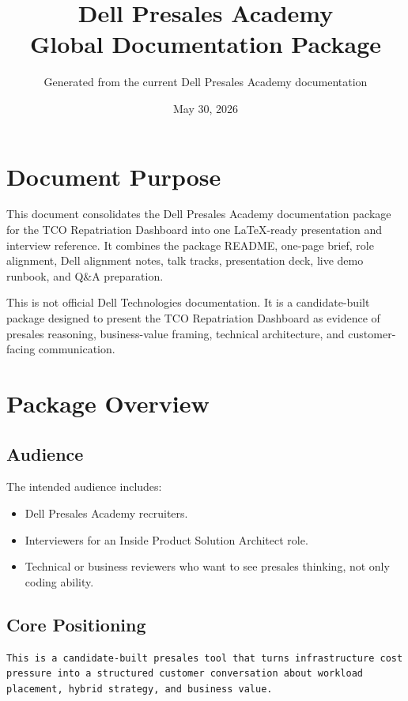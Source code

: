 \documentclass[11pt,a4paper]{article}
\title{Dell Presales Academy\\Global Documentation Package}
\author{Generated from the current Dell Presales Academy documentation}
\date{May 30, 2026}
\begin{document}
\maketitle
\tableofcontents
\newpage

\section{Document Purpose}

This document consolidates the Dell Presales Academy documentation package for the TCO Repatriation Dashboard into one LaTeX-ready presentation and interview reference. It combines the package README, one-page brief, role alignment, Dell alignment notes, talk tracks, presentation deck, live demo runbook, and Q\&A preparation.

This is not official Dell Technologies documentation. It is a candidate-built package designed to present the TCO Repatriation Dashboard as evidence of presales reasoning, business-value framing, technical architecture, and customer-facing communication.

\section{Package Overview}

\subsection{Audience}

The intended audience includes:

\begin{itemize}
  \item Dell Presales Academy recruiters.
  \item Interviewers for an Inside Product Solution Architect role.
  \item Technical or business reviewers who want to see presales thinking, not only coding ability.
\end{itemize}

\subsection{Core Positioning}

\begin{lstlisting}
This is a candidate-built presales tool that turns infrastructure cost pressure into a structured customer conversation about workload placement, hybrid strategy, and business value.
\end{lstlisting}
\end{document}
